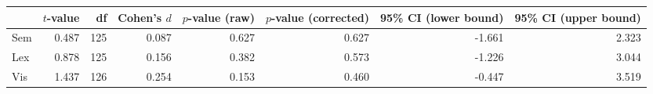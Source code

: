 \begin{tabular}{lrrrrrrr}
\toprule
 & $t$-value & df & Cohen's $d$ & $p$-value (raw) & $p$-value (corrected) & 95\% CI (lower bound) & 95\% CI (upper bound) \\
\midrule
 Sem & 0.487 & 125 & 0.087 & 0.627 & 0.627 & -1.661 & 2.323 \\
 Lex & 0.878 & 125 & 0.156 & 0.382 & 0.573 & -1.226 & 3.044 \\
 Vis & 1.437 & 126 & 0.254 & 0.153 & 0.460 & -0.447 & 3.519 \\
\bottomrule
\end{tabular}